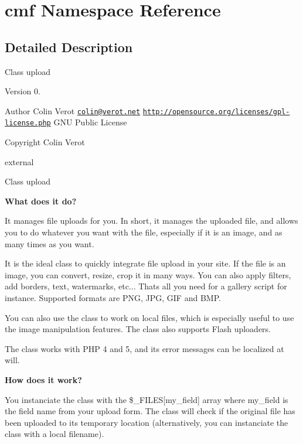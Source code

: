 \hypertarget{namespacecmf}{}\section{cmf Namespace Reference}
\label{namespacecmf}


\subsection{Detailed Description}
Class upload

\begin{DoxyVersion}{Version}
0. 
\end{DoxyVersion}
\begin{DoxyAuthor}{Author}
Colin Verot \href{mailto:colin@verot.net}{\tt colin@verot.\+net}  \href{http://opensource.org/licenses/gpl-license.php}{\tt http\+://opensource.\+org/licenses/gpl-\/license.\+php} G\+N\+U Public License 
\end{DoxyAuthor}
\begin{DoxyCopyright}{Copyright}
Colin Verot
\end{DoxyCopyright}
external

Class upload

{\bfseries What does it do?}

It manages file uploads for you. In short, it manages the uploaded file, and allows you to do whatever you want with the file, especially if it is an image, and as many times as you want.

It is the ideal class to quickly integrate file upload in your site. If the file is an image, you can convert, resize, crop it in many ways. You can also apply filters, add borders, text, watermarks, etc... That\textquotesingle{}s all you need for a gallery script for instance. Supported formats are P\+N\+G, J\+P\+G, G\+I\+F and B\+M\+P.

You can also use the class to work on local files, which is especially useful to use the image manipulation features. The class also supports Flash uploaders.

The class works with P\+H\+P 4 and 5, and its error messages can be localized at will.

{\bfseries How does it work?}

You instanciate the class with the \$\+\_\+\+F\+I\+L\+E\+S\mbox{[}\textquotesingle{}my\+\_\+field\textquotesingle{}\mbox{]} array where my\+\_\+field is the field name from your upload form. The class will check if the original file has been uploaded to its temporary location (alternatively, you can instanciate the class with a local filename).

